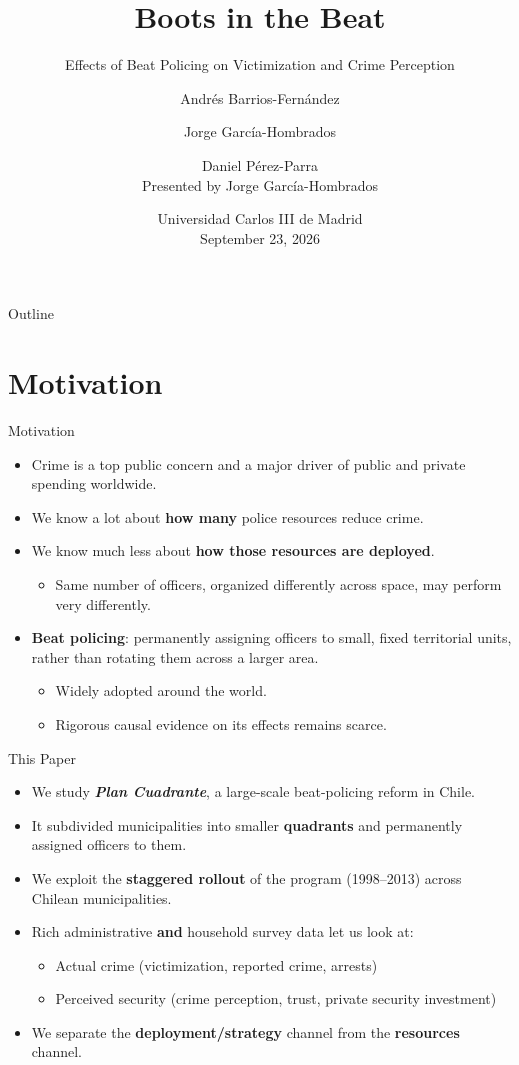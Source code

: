 \documentclass[11pt,aspectratio=169]{beamer}
\title[Beat Policing and Police Effectiveness]{Boots in the Beat}
\subtitle{Effects of Beat Policing on Victimization and Crime Perception}
\author[Garc\'ia-Hombrados]{Andr\'es Barrios-Fern\'andez \and Jorge Garc\'ia-Hombrados \and Daniel P\'erez-Parra \\[4pt] \small{Presented by Jorge Garc\'ia-Hombrados}}
\institute[UAM]{Universidad Aut\'onoma de Madrid}
\date{Universidad Carlos III de Madrid \\ September 23, 2026}
\newcommand{\PC}{\emph{Plan Cuadrante}}
\begin{document}
\begin{frame}
\titlepage
\end{frame}

\begin{frame}{Outline}
\tableofcontents
\end{frame}

\section{Motivation}

\begin{frame}{Motivation}
\begin{itemize}
\item Crime is a top public concern and a major driver of public and private spending worldwide.
\item We know a lot about \textbf{how many} police resources reduce crime.
\item We know much less about \textbf{how those resources are deployed}.
\begin{itemize}
\item Same number of officers, organized differently across space, may perform very differently.
\end{itemize}
\item \textbf{Beat policing}: permanently assigning officers to small, fixed territorial units, rather than rotating them across a larger area.
\begin{itemize}
\item Widely adopted around the world.
\item Rigorous causal evidence on its effects remains scarce.
\end{itemize}
\end{itemize}
\end{frame}

\begin{frame}{This Paper}
\begin{itemize}
\item We study \textbf{\PC}, a large-scale beat-policing reform in Chile.
\item It subdivided municipalities into smaller \textbf{quadrants} and permanently assigned officers to them.
\item We exploit the \textbf{staggered rollout} of the program (1998--2013) across Chilean municipalities.
\item Rich administrative \textbf{and} household survey data let us look at:
\begin{itemize}
\item Actual crime (victimization, reported crime, arrests)
\item Perceived security (crime perception, trust, private security investment)
\end{itemize}
\item We separate the \textbf{deployment/strategy} channel from the \textbf{resources} channel.
\end{itemize}
\end{frame}
\end{document}
